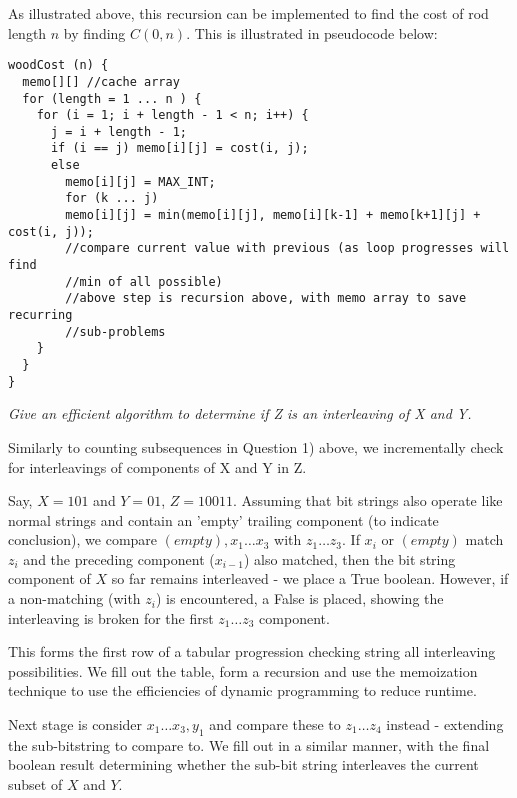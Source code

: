 \documentclass[11pt, a4paper]{article}
\begin{document}
As illustrated above, this recursion can be implemented to find the cost of rod length $n$ by finding $C(0, n)$. This is illustrated in pseudocode below:
\vspace{40mm}
\begin{lstlisting}[frame=single]
woodCost (n) {
  memo[][] //cache array
  for (length = 1 ... n ) {
    for (i = 1; i + length - 1 < n; i++) {
      j = i + length - 1;
      if (i == j) memo[i][j] = cost(i, j);
      else
        memo[i][j] = MAX_INT;
        for (k ... j)
        memo[i][j] = min(memo[i][j], memo[i][k-1] + memo[k+1][j] + cost(i, j));
        //compare current value with previous (as loop progresses will find
        //min of all possible)
        //above step is recursion above, with memo array to save recurring 
        //sub-problems
    }
  }
}
\end{lstlisting}


\textit{Give an efficient algorithm to determine if Z is an interleaving of X and Y.}
\vspace{4mm}

Similarly to counting subsequences in Question 1) above, we incrementally check for interleavings of components of X and Y in Z.

Say, $X =  101$ and $Y = 01$,  $Z = 10011$.
Assuming that bit strings also operate like normal strings and contain an 'empty' trailing component (to indicate conclusion), we compare $(empty), x_1 \dots x_3$ with $z_1 \dots z_3$.
If $x_i$ or $(empty)$ match $z_i$ and the preceding component ($x_{i-1}$) also matched, then the bit string component of $X$ so far remains interleaved - we place a True boolean.
However, if a non-matching (with $z_i$) is encountered, a False is placed, showing the interleaving is broken for the first $z_1 \dots z_3$ component.

This forms the first row of a tabular progression checking string all interleaving possibilities.
We fill out the table, form a recursion and use the memoization technique to use the efficiencies of dynamic programming to reduce runtime.

Next stage is consider $x_1 \dots x_3, y_1$ and compare these to $z_1 \dots z_4$ instead - extending the sub-bitstring to compare to. We fill out in a similar manner, with the final boolean result determining whether the sub-bit string interleaves the current subset of $X$ and $Y$.
\end{document}
